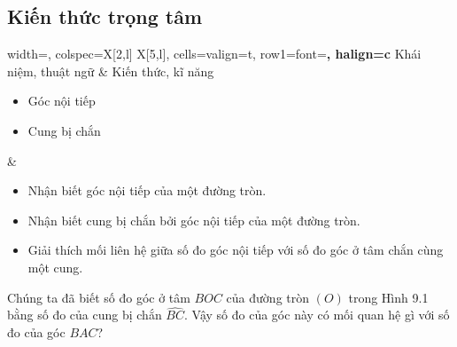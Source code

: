 \begin{lesson}
    \subsection{Kiến thức trọng tâm}

    \begin{center}
    \begin{tblr}{
        width=\linewidth,
        colspec={X[2,l] X[5,l]},
        cells={valign=t},
        row{1}={font=\bfseries, halign=c}
    }
        Khái niệm, thuật ngữ & Kiến thức, kĩ năng \\
        \begin{minipage}[t]{\linewidth}
        \begin{itemize}
            \item Góc nội tiếp
            \item Cung bị chắn
        \end{itemize}
        \end{minipage}
        &
        \begin{minipage}[t]{\linewidth}
        \begin{itemize}
            \item Nhận biết góc nội tiếp của một đường tròn.
            \item Nhận biết cung bị chắn bởi góc nội tiếp của một đường tròn.
            \item Giải thích mối liên hệ giữa số đo góc nội tiếp với số đo góc ở tâm chắn cùng một cung.
        \end{itemize}
        \end{minipage}
    \end{tblr}
    \end{center}

    Chúng ta đã biết số đo góc ở tâm $BOC$ của đường tròn $(O)$ trong Hình 9.1 bằng số đo của cung bị chắn $\widehat{BC}$. Vậy số đo của góc này có mối quan hệ gì với số đo của góc $BAC$?

    \begin{center}


\end{center}
\end{lesson}
